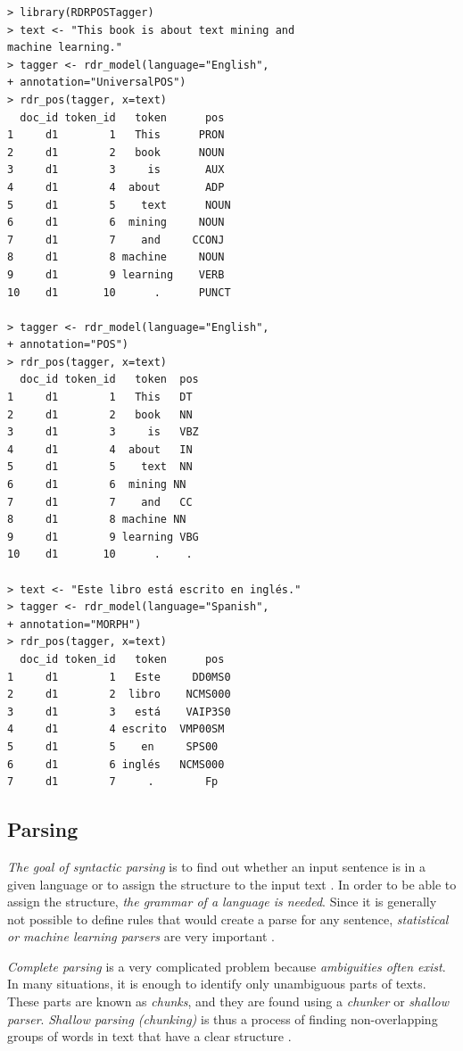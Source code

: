 \begin{verbatim}
> library(RDRPOSTagger)
> text <- "This book is about text mining and
machine learning."
> tagger <- rdr_model(language="English",
+ annotation="UniversalPOS")
> rdr_pos(tagger, x=text)
  doc_id token_id   token      pos
1     d1        1   This      PRON
2     d1        2   book      NOUN
3     d1        3     is       AUX
4     d1        4  about       ADP
5     d1        5    text      NOUN
6     d1        6  mining     NOUN
7     d1        7    and     CCONJ
8     d1        8 machine     NOUN
9     d1        9 learning    VERB
10    d1       10      .      PUNCT

> tagger <- rdr_model(language="English",
+ annotation="POS")
> rdr_pos(tagger, x=text)
  doc_id token_id   token  pos
1     d1        1   This   DT
2     d1        2   book   NN
3     d1        3     is   VBZ
4     d1        4  about   IN
5     d1        5    text  NN
6     d1        6  mining NN
7     d1        7    and   CC
8     d1        8 machine NN
9     d1        9 learning VBG
10    d1       10      .    .

> text <- "Este libro está escrito en inglés."
> tagger <- rdr_model(language="Spanish",
+ annotation="MORPH")
> rdr_pos(tagger, x=text)
  doc_id token_id   token      pos
1     d1        1   Este     DD0MS0
2     d1        2  libro    NCMS000
3     d1        3   está    VAIP3S0
4     d1        4 escrito  VMP00SM
5     d1        5    en     SPS00
6     d1        6 inglés   NCMS000
7     d1        7     .        Fp
\end{verbatim}

\subsection{Parsing}

\textit{The goal of syntactic parsing} is to find out whether an input sentence is in a given
language or to assign the structure to the input text \cite{ref206}. In order to be able to
assign the structure, \textit{the grammar of a language is needed}. Since it is generally
not possible to define rules that would create a parse for any sentence, \textit{statistical or machine learning parsers} are very important \cite{ref54}.

\textit{Complete parsing} is a very complicated problem because \textit{ambiguities often
exist}. In many situations, it is enough to identify only unambiguous parts of texts.
These parts are known as \textit{chunks}, and they are found using a \textit{chunker} or
\textit{shallow parser}. \textit{Shallow parsing (chunking)} is thus a process of finding
non-overlapping groups of words in text that have a clear structure \cite{ref2}.

